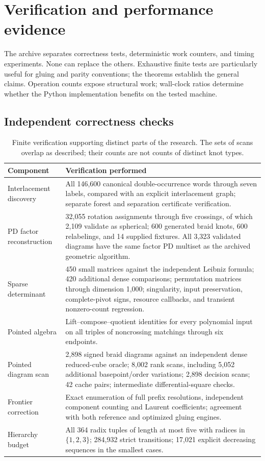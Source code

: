 \section{Verification and performance evidence}
\label{sec:experiments}

The archive separates correctness tests, deterministic work counters, and
timing experiments.  None can replace the others.  Exhaustive finite tests
are particularly useful for gluing and parity conventions; the theorems
establish the general claims.  Operation counts expose structural work;
wall-clock ratios determine whether the Python implementation benefits on
the tested machine.

\subsection{Independent correctness checks}

\begin{table}[htbp]
\centering\small
\begin{tabular}{P{34mm}P{108mm}}
\toprule
Component & Verification performed \\
\midrule
Interlacement discovery & All 146,600 canonical double-occurrence words
through seven labels, compared with an explicit interlacement graph;
separate forest and separation certificate verification. \\
PD factor reconstruction & 32,055 rotation assignments through five
crossings, of which 2,109 validate as spherical; 600 generated braid knots,
600 relabelings, and 14 supplied fixtures.  All 3,323 validated diagrams
have the same factor PD multiset as the archived geometric algorithm. \\
Sparse determinant & 450 small matrices against the independent Leibniz
formula; 420 additional dense comparisons; permutation matrices through
dimension 1,000; singularity, input preservation, complete-pivot signs,
resource callbacks, and transient nonzero-count regression. \\
Pointed algebra & Lift--compose--quotient identities for every polynomial
input on all triples of noncrossing matchings through six endpoints. \\
Pointed diagram scan & 2,898 signed braid diagrams against an independent
dense reduced-cube oracle; 8,002 rank scans, including 5,052 additional
basepoint/order variations; 2,898 decision scans; 42 cache pairs;
intermediate differential-square checks. \\
Frontier correction & Exact enumeration of full prefix resolutions,
independent component counting and Laurent coefficients; agreement with
both reference and optimized gluing engines. \\
Hierarchy budget & All 364 radix tuples of length at most five with
radices in $\{1,2,3\}$; 284,932 strict transitions; 17,021 explicit
decreasing sequences in the smallest cases. \\
\bottomrule
\end{tabular}
\caption{Finite verification supporting distinct parts of the research.
The sets of scans overlap as described; their counts are not counts of
distinct knot types.}
\label{tab:validation}
\end{table}


